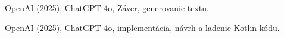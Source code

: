 \begin{trivlist}
\item OpenAI (2025), ChatGPT 4o, Záver, generovanie textu.

\item OpenAI (2025), ChatGPT 4o, implementácia, návrh a ladenie Kotlin kódu.
\end{trivlist}
